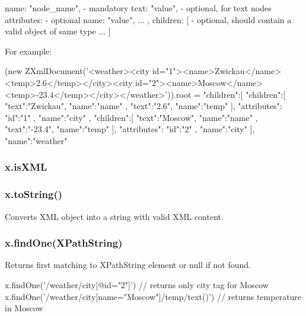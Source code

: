 \begin{listingverbatim}
{
    name: "node_name", - mandatory
    text: "value", - optional, for text nodes
    attributes: { - optional
    	name: "value",
    	...
    },
    children: [ - optional, should contain a valid object of same type
    	{ ... }
    ]
}
\end{listingverbatim}

For example:
\begin{listingverbatim}
(new ZXmlDocument('<weather><city id="1"><name>Zwickau</name><temp>2.6</temp></city><city id="2"><name>Moscow</name><temp>-23.4</temp></city></weather>')).root =
{
   "children":[
      {
         "children":[
            {
               "text":"Zwickau",
               "name":"name"
            },
            {
               "text":"2.6",
               "name":"temp"
            }
         ],
         "attributes":{
            "id":"1"
         },
         "name":"city"
      },
      {
         "children":[
            {
               "text":"Moscow",
               "name":"name"
            },
            {
               "text":"-23.4",
               "name":"temp"
            }
         ],
         "attributes":{
            "id":"2"
         },
         "name":"city"
      }
   ],
   "name":"weather"
}
\end{listingverbatim}

\subsubsection{x.isXML}

\subsubsection{x.toString()}
Converts XML object into a string with valid XML content.

\subsubsection{x.findOne(XPathString)}
Returns first matching to XPathString element or null if not found.
\begin{listingverbatim}
x.findOne('/weather/city[@id="2"]') // returns only city tag for Moscow
x.findOne('/weather/city[name="Moscow"]/temp/text()') // returns temperature in Moscow
\end{listingverbatim}

